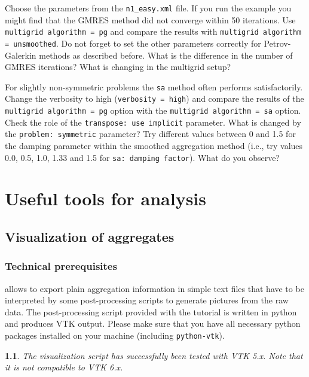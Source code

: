 \documentclass[10pt,fleqn]{book}
\newtheorem*{mycomment}{\ding{42}}
\begin{document}
\begin{exercise} Choose the parameters from the \texttt{n1\_easy.xml} file. If you run the example you might find that the GMRES method did not converge within 50 iterations. Use \texttt{multigrid algorithm = pg} and compare the results with \texttt{multigrid algorithm = unsmoothed}. Do not forget to set the other parameters correctly for Petrov-Galerkin methods as described before. What is the difference in the number of GMRES iterations? What is changing in the multigrid setup?
\end{exercise}
\begin{exercise}
For slightly non-symmetric problems the \texttt{sa} method often performs satisfactorily. Change the verbosity to high (\texttt{verbosity = high}) and compare the results of the \texttt{multigrid algorithm = pg} option with the \texttt{multigrid algorithm = sa} option. Check the role of the \texttt{transpose: use implicit} parameter. What is changed by the \texttt{problem: symmetric} parameter? Try different values between 0 and 1.5 for the damping parameter within the smoothed aggregation method (i.e., try values 0.0, 0.5, 1.0, 1.33 and 1.5 for \texttt{sa: damping factor}). What do you observe?
\end{exercise}

\chapter{Useful tools for analysis}

\section{Visualization of aggregates}

\subsection{Technical prerequisites}
\muelu allows to export plain aggregation information in simple text files that have to be interpreted by some post-processing scripts to generate pictures from the raw data. The post-processing script provided with the \muelu tutorial is written in python and produces VTK output. Please make sure that you have all necessary python packages installed on your machine (including \verb|python-vtk|).

\begin{mycomment}
The visualization script has successfully been tested with VTK 5.x. Note that it is not compatible to VTK 6.x.
\end{mycomment}
\end{document}
